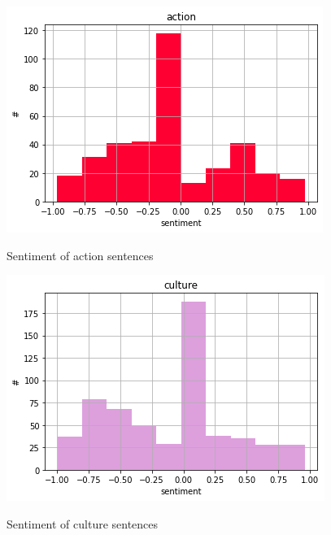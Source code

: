 \documentclass[11pt,letterpaper]{article}
\begin{document}

\begin{figure}[hbt!]
  \centering
  \begin{minipage}[b]{0.45\textwidth}
    \includegraphics[width=\textwidth]{images/senti_act.png}
    \label{fig:senti_act}
    \caption{Sentiment of action sentences}
  \end{minipage}
  \hfill
  \begin{minipage}[b]{0.45\textwidth}
    \includegraphics[width=\textwidth]{images/senti_cult.png}
    \label{fig:senti_cult}
    \caption{Sentiment of culture sentences}
  \end{minipage}
\end{figure}


\end{document}
